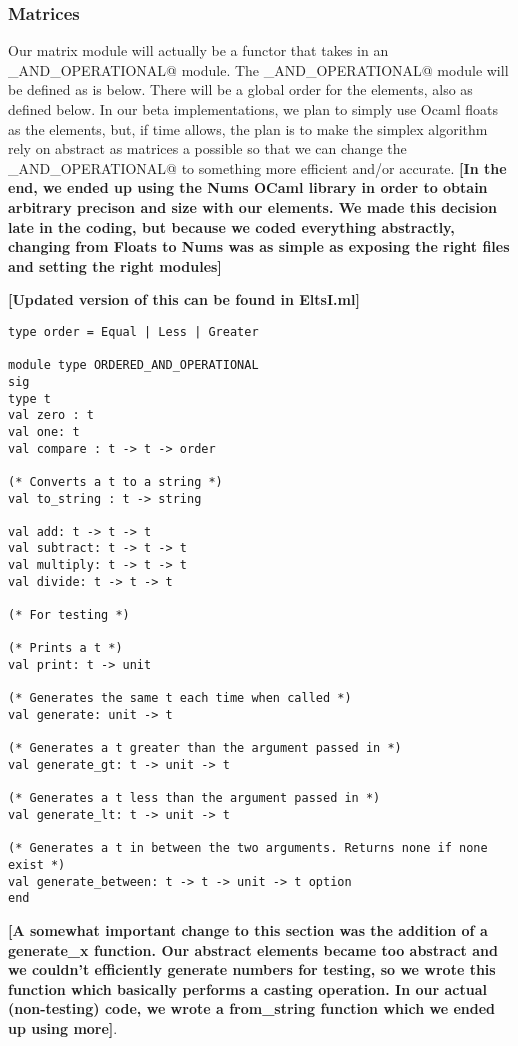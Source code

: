 \documentclass[letterpaper,11pt]{article}
\newcommand{\annot}[1]{\textbf{\color{BrickRed} [#1]}}
\begin{document}
\subsubsection{Matrices}

Our matrix module will actually be a functor that takes in an
\verb@ORDERED_AND_OPERATIONAL@ module. The \verb@ORDERED_AND_OPERATIONAL@ module
will be defined as is below. There will be a global order for the elements, also
as defined below. In our beta implementations, we plan to simply use Ocaml
floats as the elements, but, if time allows, the plan is to make the simplex
algorithm rely on abstract as matrices a possible so that we can change the
\verb@ORDERED_AND_OPERATIONAL@ to something more efficient and/or accurate.
{\annot{In the end, we ended up using the Nums OCaml library in order to obtain
arbitrary precison and size with our elements. We made this decision late in the
coding, but because we coded everything abstractly, changing from Floats to Nums
was as simple as exposing the right files and setting the right modules}}

{\annot{Updated version of this can be found in EltsI.ml}}
\begin{verbatim}
type order = Equal | Less | Greater

module type ORDERED_AND_OPERATIONAL
sig
type t
val zero : t
val one: t
val compare : t -> t -> order

(* Converts a t to a string *)
val to_string : t -> string

val add: t -> t -> t
val subtract: t -> t -> t
val multiply: t -> t -> t
val divide: t -> t -> t

(* For testing *)

(* Prints a t *)
val print: t -> unit

(* Generates the same t each time when called *)
val generate: unit -> t

(* Generates a t greater than the argument passed in *)
val generate_gt: t -> unit -> t

(* Generates a t less than the argument passed in *)
val generate_lt: t -> unit -> t

(* Generates a t in between the two arguments. Returns none if none exist *)
val generate_between: t -> t -> unit -> t option
end
\end{verbatim}

{\annot{A somewhat important change to this section was the addition of a 
generate\_x function. Our abstract elements became too abstract and we
couldn't efficiently generate numbers for testing, so we wrote this function which
basically performs a casting operation. In our actual (non-testing) code, we
wrote a from\_string function which we ended up using more}}.
\end{document}
